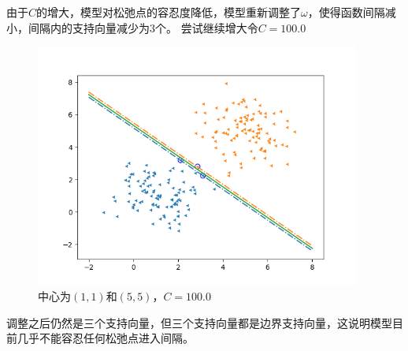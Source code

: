 \documentclass{article}
\begin{document}
由于$C$的增大，模型对松弛点的容忍度降低，模型重新调整了$\omega$，使得函数间隔减小，间隔内的支持向量减少为$3$个。
尝试继续增大令$C=100.0$
\begin{figure}[H]
    \centering
    \begin{minipage}[t]{1.0\linewidth}
        \centering
        \includegraphics[height=8cm]{100c.png}
        \caption{中心为$(1,1)$和$(5,5)$，$C=100.0$}
\end{minipage}
\end{figure}
调整之后仍然是三个支持向量，但三个支持向量都是边界支持向量，这说明模型目前几乎不能容忍任何松弛点进入间隔。
\end{document}
